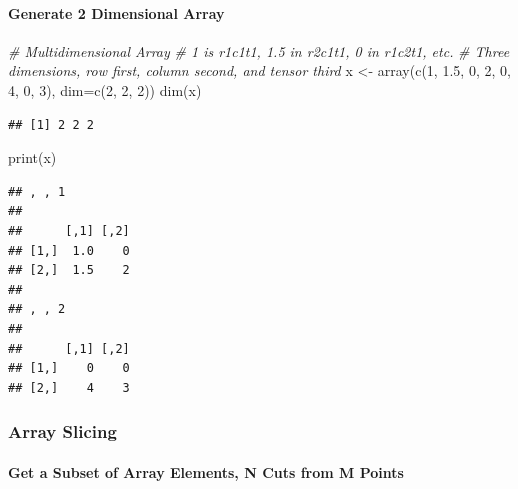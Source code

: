 \documentclass[
]{book}
\newenvironment{Shaded}{\begin{snugshade}}{\end{snugshade}}
\newcommand{\AttributeTok}[1]{\textcolor[rgb]{0.77,0.63,0.00}{#1}}
\newcommand{\CommentTok}[1]{\textcolor[rgb]{0.56,0.35,0.01}{\textit{#1}}}
\newcommand{\DecValTok}[1]{\textcolor[rgb]{0.00,0.00,0.81}{#1}}
\newcommand{\FloatTok}[1]{\textcolor[rgb]{0.00,0.00,0.81}{#1}}
\newcommand{\FunctionTok}[1]{\textcolor[rgb]{0.00,0.00,0.00}{#1}}
\newcommand{\NormalTok}[1]{#1}
\newcommand{\OtherTok}[1]{\textcolor[rgb]{0.56,0.35,0.01}{#1}}
\begin{document}
\hypertarget{generate-2-dimensional-array}{%
\paragraph{Generate 2 Dimensional Array}\label{generate-2-dimensional-array}}

\begin{Shaded}
\begin{Highlighting}[]
\CommentTok{\# Multidimensional Array}
\CommentTok{\# 1 is r1c1t1, 1.5 in r2c1t1, 0 in r1c2t1, etc.}
\CommentTok{\# Three dimensions, row first, column second, and tensor third}
\NormalTok{x }\OtherTok{\textless{}{-}} \FunctionTok{array}\NormalTok{(}\FunctionTok{c}\NormalTok{(}\DecValTok{1}\NormalTok{, }\FloatTok{1.5}\NormalTok{, }\DecValTok{0}\NormalTok{, }\DecValTok{2}\NormalTok{, }\DecValTok{0}\NormalTok{, }\DecValTok{4}\NormalTok{, }\DecValTok{0}\NormalTok{, }\DecValTok{3}\NormalTok{), }\AttributeTok{dim=}\FunctionTok{c}\NormalTok{(}\DecValTok{2}\NormalTok{, }\DecValTok{2}\NormalTok{, }\DecValTok{2}\NormalTok{))}
\FunctionTok{dim}\NormalTok{(x)}
\end{Highlighting}
\end{Shaded}

\begin{verbatim}
## [1] 2 2 2
\end{verbatim}

\begin{Shaded}
\begin{Highlighting}[]
\FunctionTok{print}\NormalTok{(x)}
\end{Highlighting}
\end{Shaded}

\begin{verbatim}
## , , 1
## 
##      [,1] [,2]
## [1,]  1.0    0
## [2,]  1.5    2
## 
## , , 2
## 
##      [,1] [,2]
## [1,]    0    0
## [2,]    4    3
\end{verbatim}

\hypertarget{array-slicing}{%
\subsubsection{Array Slicing}\label{array-slicing}}

\hypertarget{get-a-subset-of-array-elements-n-cuts-from-m-points}{%
\paragraph{Get a Subset of Array Elements, N Cuts from M Points}\label{get-a-subset-of-array-elements-n-cuts-from-m-points}}
\end{document}
